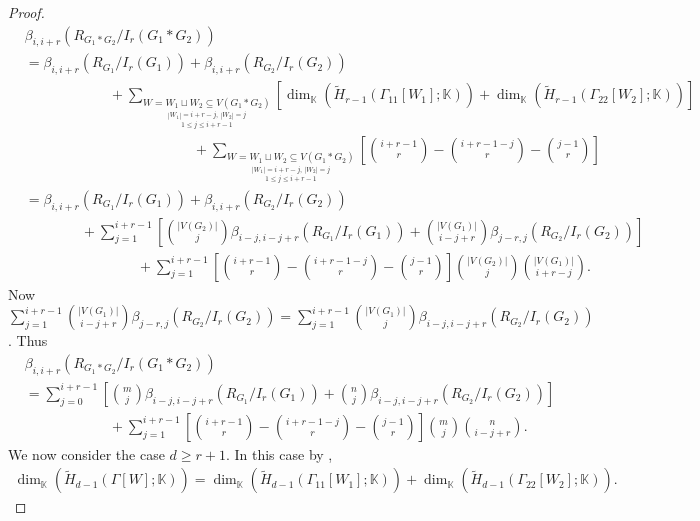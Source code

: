 \documentclass[10pt,a4paper]{amsart}
\newcommand{\K}{\mathbb K}
\begin{document}
\begin{proof}
       {\footnotesize
    \begin{align*}
    &\beta_{i,i+r}(R_{G_1*G_2}/I_r(G_1*G_2))\\
       &=\beta_{i,i+r}(R_{G_1}/I_r(G_1))+\beta_{i,i+r}(R_{G_2}/I_r(G_2))\\
       &\hspace{6em}+\sum_{\underset{1\le j\le i+r-1}{\underset{|W_1|=i+r-j,\,|W_2|=j}{W=W_1\sqcup W_2 \subseteq V(G_1*G_2) }}}\left[\dim_{\K}(\widetilde H_{r-1}(\Gamma_{11}[W_1];\K))+\dim_{\K}(\widetilde H_{r-1}(\Gamma_{22}[W_2];\K))\right]\\
       &\hspace{12em}+\sum_{\underset{1\le j\le i+r-1}{\underset{|W_1|=i+r-j,\,|W_2|=j}{W=W_1\sqcup W_2 \subseteq V(G_1*G_2) }}}\left[{i+r-1\choose r}-{i+r-1-j\choose r}-{j-1\choose r}\right]\\
       &=\beta_{i,i+r}(R_{G_1}/I_r(G_1))+\beta_{i,i+r}(R_{G_2}/I_r(G_2))\\
       &\hspace{4em}+\sum_{j=1}^{i+r-1}\left[ {|V(G_2)|\choose j}\beta_{i-j,i-j+r}(R_{G_1}/I_r(G_1))+{|V(G_1)|\choose i-j+r}\beta_{j-r,j}(R_{G_2}/I_r(G_2)) \right]\\
       &\hspace{8em}+\sum_{j=1}^{i+r-1}\left[{i+r-1\choose r}-{i+r-1-j\choose r}-{j-1\choose r}\right]{|V(G_2)|\choose j}{|V(G_1)|\choose i+r-j}.
    \end{align*}}
    \noindent
    Now $\sum_{j=1}^{i+r-1}{|V(G_1)|\choose i-j+r}\beta_{j-r,j}(R_{G_2}/I_r(G_2))=\sum_{j=1}^{i+r-1}{|V(G_1)|\choose j}\beta_{i-j,i-j+r}(R_{G_2}/I_r(G_2))$. Thus
    {\footnotesize
    \begin{align*}
        &\beta_{i,i+r}(R_{G_1*G_2}/I_r(G_1*G_2))\\
        &=\sum_{j=0}^{i+r-1}\left[ {m\choose j}\beta_{i-j,i-j+r}(R_{G_1}/I_r(G_1))+{n\choose j}\beta_{i-j,i-j+r}(R_{G_2}/I_r(G_2)) \right]\\
       &\hspace{6em}+\sum_{j=1}^{i+r-1}\left[{i+r-1\choose r}-{i+r-1-j\choose r}-{j-1\choose r}\right]{m\choose j}{n\choose i-j+r}.
    \end{align*}}
    \noindent
    We now consider the case $d\ge r+1$. In this case by ,
    {\footnotesize
    \begin{align*}
     \dim_{\K}(\widetilde H_{d-1}(\Gamma[W];\K))=\dim_{\K}(\widetilde H_{d-1}(\Gamma_{11}[W_1];\K))+\dim_{\K}(\widetilde H_{d-1}(\Gamma_{22}[W_2];\K)).
    \end{align*}}

\end{proof}
\end{document}
